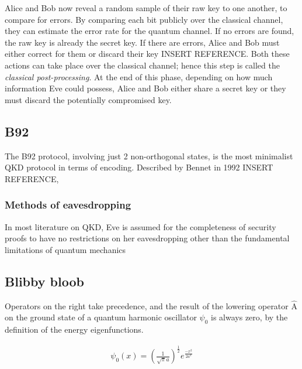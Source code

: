 \documentclass[paper=a4, fontsize=11pt]{scrartcl} %
\numberwithin{equation}{section} %
\numberwithin{figure}{section} %
\numberwithin{table}{section} %
\begin{document}
Alice and Bob now reveal a random sample of their raw key to one another, to compare for errors. By
comparing each bit publicly over the classical channel, they can estimate the error rate for
the quantum channel. If no errors are found, the raw key is already the secret key. If there are
errors, Alice and Bob must either correct for them or discard their key INSERT REFERENCE. Both these actions can
take place over the classical channel; hence this step is called the \textit{classical post-processing}.
At the end of this phase, depending on how much information Eve could possess, Alice and Bob either share
a secret key or they must discard the potentially compromised key.

\subsection{B92}
The B92 protocol, involving just 2 non-orthogonal states, is the most minimalist QKD protocol in terms
of encoding. Described by Bennet in 1992 INSERT REFERENCE, 

\subsubsection{Methods of eavesdropping}
In most literature on QKD, Eve is assumed for the completeness of security proofs to have no restrictions
on her eavesdropping other than the fundamental limitations of quantum mechanics





















\subsection{Blibby bloob}
Operators on the right take precedence, and the result of the lowering operator $\hat{\textrm{A}}$ on the ground state of a quantum harmonic oscillator $\psi_0$ is always zero, by the definition of the energy eigenfunctions.

\begin{align}
\psi_0 (x) =
\left(\frac{1}{\sqrt{\pi}a}\right)^{\frac{1}{2}}
e^{\frac{-x^2}{2a^2}}
\end{align}
\end{document}
